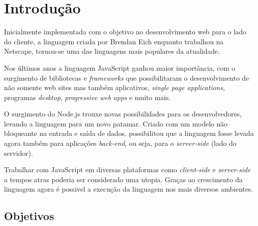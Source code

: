 \documentclass[
	12pt,				%
	openright,			%
	twoside,			%
	a4paper,			%
	english,			%
	brazil				%
	]{abntex2}
\begin{document}
\tableofcontents*
\cleardoublepage


\textual


\chapter{Introdução}

Inicialmente implementada com o objetivo no desenvolvimento web para o lado do cliente, a linguagem criada por Brendan Eich enquanto trabalhou na Netscape, tornou-se uma das linguagens mais populares da atualidade.

Nos últimos anos a linguagem JavaScript ganhou maior importância, com o surgimento de bibliotecas e \textit{frameworks} que possibilitaram o desenvolvimento de não somente web sites mas também aplicativos, \textit{single page applications}, programas \textit{desktop}, \textit{progressive web apps} e muito mais.

O surgimento do Node.js trouxe novas possibilidades para os desenvolvedores, levando a linguagem para um novo patamar. Criado com um modelo não bloqueante na entrada e saída de dados, possibilitou que a linguagem fosse levada agora também para aplicações \textit{back-end}, ou seja, para o \textit{server-side} (lado do servidor). %

Trabalhar com JavaScript em diversas plataformas como \textit{client-side} e \textit{server-side} a tempos atras poderia ser considerado uma utopia. Graças ao crescimento da linguagem agora é possivel a execução da linguagem nos mais diversos ambientes. %

\section{Objetivos}
\end{document}
